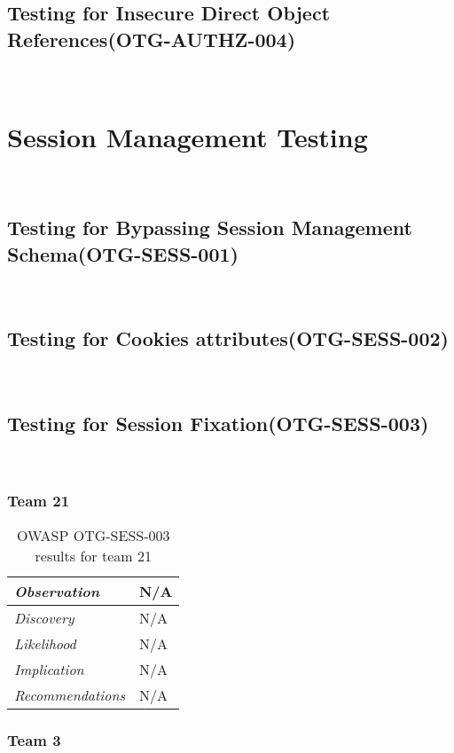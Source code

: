 \documentclass[headsepline,footsepline,footinclude=false,oneside,fontsize=11pt,paper=a4,listof=totoc,bibliography=totoc]{scrbook} %
\begin{document}
\subsection{Testing for Insecure Direct Object References(OTG-AUTHZ-004)}\
 
\pagebreak 
\section{Session Management Testing}\
\subsection{Testing for Bypassing Session Management Schema(OTG-SESS-001)}\
\pagebreak 
\subsection{Testing for Cookies attributes(OTG-SESS-002)}\
\pagebreak 
\subsection{Testing for Session Fixation(OTG-SESS-003)}\

 
 \subsubsection{Team 21}
 
 \begin{table}[H]
 	\centering
 	\begin{tabular}{l p{11cm}} 
 		\textit{Observation} &  N/A\\ 
 		\hline
 		\textit{Discovery} &  N/A \\
 		\hline
 		\textit{Likelihood} & N/A\\
 		\hline
 		\textit{Implication} & N/A\\
 		\hline
 		\textit{Recommendations} & N/A\\ 
 	\end{tabular}
 	\caption{OWASP OTG-SESS-003 results for team 21}
 	\label{table:scenario2}
 \end{table}
 
 \subsubsection{Team 3}
 
\end{document}
